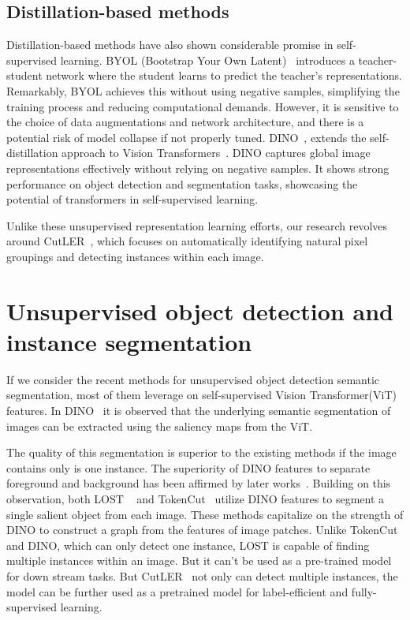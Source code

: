\subsection{Distillation-based methods}
Distillation-based methods have also shown considerable promise in self-supervised learning. BYOL (Bootstrap Your Own Latent)~\cite{grill2020bootstrap} introduces a teacher-student network where the student learns to predict the teacher's representations. Remarkably, BYOL achieves this without using negative samples, simplifying the training process and reducing computational demands. However, it is sensitive to the choice of data augmentations and network architecture, and there is a potential risk of model collapse if not properly tuned. DINO~\cite{caron2021emerging}, extends the self-distillation approach to Vision Transformers~\cite{dosovitskiy2020image}. DINO captures global image representations effectively without relying on negative samples. It shows strong performance on object detection and segmentation tasks, showcasing the potential of transformers in self-supervised learning.

Unlike these unsupervised representation learning efforts, our research revolves around CutLER~\cite{wang2023cut}, which focuses on automatically identifying natural pixel groupings and detecting instances within each image.

\section{Unsupervised object detection and instance segmentation}
If we consider the recent methods for unsupervised object detection semantic segmentation, most of them leverage on self-supervised Vision Transformer(ViT)~\cite{dosovitskiy2020image} features. In DINO~\cite{caron2021emerging} it is observed that the underlying semantic segmentation of images can be extracted using the saliency maps from the ViT. 

The quality of this segmentation is superior to the existing methods if the image contains only is one instance. The superiority of DINO features to separate foreground and background has been affirmed by later works~\cite{engstler2023understanding}. Building on this observation, both LOST ~\cite{simeoni2021localizing} and TokenCut~\cite{wang2022tokencut} utilize DINO features to segment a single salient object from each image. These methods capitalize on the strength of DINO to construct a graph from the features of image patches. Unlike TokenCut and DINO, which can only detect one instance, LOST is capable of finding multiple instances within an image. But it can't be used as a pre-trained model for down stream tasks. But CutLER~\cite{wang2023cut} not only can detect multiple instances, the model can be further used as a pretrained model for label-efficient and fully-supervised learning.

